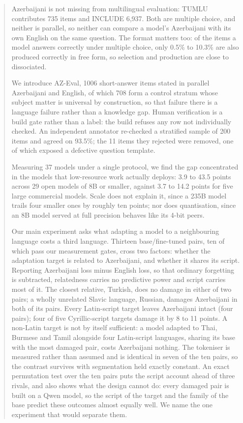 \documentclass[final]{clv2025}
\begin{document}
\begin{abstract}
Azerbaijani is not missing from multilingual evaluation: TUMLU contributes 735
items and INCLUDE 6,937. Both are multiple choice, and neither is parallel, so
neither can compare a model's Azerbaijani with its own English on the same
question. The format matters too: of the items a model answers correctly under
multiple choice, only 0.5\% to 10.3\% are also produced correctly in free form,
so selection and production are close to dissociated.

We introduce AZ-Eval, 1006 short-answer items stated in parallel Azerbaijani
and English, of which 708 form a control stratum whose subject matter is
universal by construction, so that failure there is a language failure rather
than a knowledge gap. Human verification is a build gate rather than a label:
the build refuses any row not individually checked. An independent annotator
re-checked a stratified sample of 200 items and agreed on 93.5\%; the 11 items
they rejected were removed, one of which exposed a defective question template.

Measuring 37 models under a single protocol, we find the gap concentrated in
the models that low-resource work actually deploys: 3.9 to 43.5 points across
29 open models of 8B or smaller, against 3.7 to 14.2 points for five large
commercial models. Scale does not explain it, since a 235B model trails four
smaller ones by roughly ten points; nor does quantisation, since an 8B model
served at full precision behaves like its 4-bit peers.

Our main experiment asks what adapting a model to a neighbouring language costs
a third language. Thirteen base/fine-tuned pairs, ten of which pass our
measurement gates, cross two factors: whether the adaptation target is related
to Azerbaijani, and whether it shares its script. Reporting Azerbaijani loss
minus English loss, so that ordinary forgetting is subtracted, relatedness
carries no predictive power and script carries most of it. The closest
relative, Turkish, does no damage in either of two pairs; a wholly unrelated
Slavic language, Russian, damages Azerbaijani in both of its pairs. Every
Latin-script target leaves Azerbaijani intact (four pairs); four of five
Cyrillic-script targets damage it by 8 to 11 points. A non-Latin target is not
by itself sufficient: a model adapted to Thai, Burmese and Tamil alongside four
Latin-script languages, sharing its base with the most damaged pair, costs
Azerbaijani nothing. The tokeniser is measured rather than assumed and is
identical in seven of the ten pairs, so the contrast survives with segmentation
held exactly constant. An exact permutation test over the ten pairs puts the
script account ahead of three rivals, and also shows what the design cannot do:
every damaged pair is built on a Qwen model, so the script of the target and
the family of the base predict these outcomes almost equally well. We name the
one experiment that would separate them.


\end{abstract}
\end{document}
